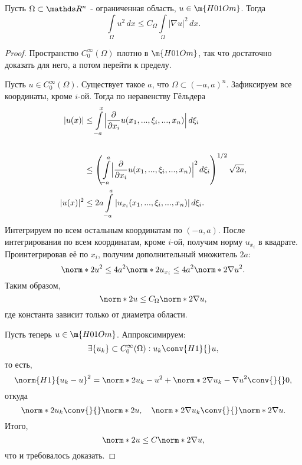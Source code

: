 
\begin{theorem} Пусть $\Omega \subset \real^n$ - ограниченная область, $u \in \m{H01Om}$. Тогда
$$ \int \limits_\Omega u^2 \, dx \leq C_\Omega \int \limits_\Omega |\nabla u|^2 \, dx.$$
\end{theorem}
\begin{proof} Пространство $C_0^\infty(\Omega)$ плотно в $\m{H01Om}$, так что достаточно доказать для него, а потом перейти к пределу.

Пусть $u \in C_0^\infty(\Omega)$. Существует такое $a$, что $\Omega \subset (-a,a)^n.$ Зафиксируем все координаты, кроме $i$-ой. Тогда по неравенству Гёльдера
\begin{align*}
|u(x)| &\leq \int \limits_{-a}^x \Bigl\lvert \frac{\partial}{\partial x_i} u(x_1, ..., \xi_i, ..., x_n) \Bigr\rvert \, d \xi_i \\ \\
& \leq \left( \int \limits_{-a}^a \Bigl\lvert \frac{\partial}{\partial x_i} u(x_1, ..., \xi_i, ..., x_n)  \Bigr\rvert^2 \, d\xi_i\right)^{1/2} \sqrt{2a},\\
|u(x)|^2 &\leq 2a \int \limits_{-a}^a | u_{x_i} (x_1, ..., \xi_i, ..., x_n) | \, d\xi_i.
\end{align*}
Интегрируем по всем остальным координатам по $(-a, a)$. После интегрирования по всем координатам, кроме $i$-ой, получим норму $u_{x_i}$ в квадрате. Проинтегрировав её по $x_i$, получим дополнительный множитель $2a$:
$$ \norm*{2}{u}^2 \leq 4a^2 \norm*{2}{u_{x_i}} \leq 4a^2 \norm*{2}{\nabla u}^2.$$
Таким образом,
$$\norm*{2}{u} \leq C_\Omega \norm*{2}{\nabla u},$$
где константа зависит только от диаметра области.

Пусть теперь $u \in \m{H01Om}$. Аппроксимируем:
$$ \exists \{u_k \} \subset C_0^\infty(\Omega) : u_k  \conv{H1}{} u,$$
то есть,
$$ \norm{H1}{u_k - u}^2 = \norm*{2}{u_k - u}^2 + \norm*{2}{\nabla u_k - \nabla u}^2 \conv{}{} 0,$$
откуда
$$\norm*{2}{u_k} \conv{}{} \norm*{2}{u}, \quad \norm*{2}{\nabla u_k} \conv{}{} \norm*{2}{\nabla u}.$$
Итого,
$$ \norm*{2}{u} \leq C \norm*{2}{\nabla u},$$
что и требовалось доказать.
\end{proof}

